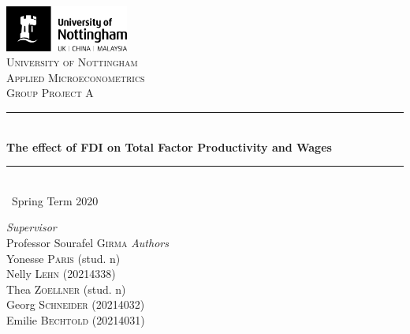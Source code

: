 \documentclass[a4paper,12pt]{scrartcl}
\newcommand{\sectionnumbering}[1]{%
  \setcounter{section}{0}%
   \renewcommand{\thesection}{\csname #1\endcsname{section}}}
\begin{document}
	\begin{titlepage}
		\newcommand{\HRule}{\rule{\linewidth}{0.5mm}}
		
	\vfill\vfill
	\includegraphics[height=1.5cm]{UoN_Logo}\\[1cm] 


	\center			
	\textsc{\LARGE University of Nottingham}\\[1.5cm] 
	\textsc{\Large Applied Microeconometrics}\\[0.5cm] 	
	\textsc{\large Group Project A}\\[0.5cm] 
	
	\HRule\\[0.4cm]
	{\huge\bfseries The effect of FDI on Total Factor Productivity and Wages}\\[0.4cm] 
	\HRule\\[0.4cm]
	
	{\large\ Spring Term 2020} 	
	\vfill\vfill\vfill 		
	
\begin{flushleft}
			\large
			\textit{Supervisor}\\
			Professor Sourafel \textsc{Girma} 
			\vfill\vfill 
			\textit{Authors}\\
			Yonesse \textsc{Paris} (stud. n)\\
			Nelly  \textsc{Lehn} (20214338)\\
			Thea  \textsc{Zoellner} (stud. n)\\
			Georg  \textsc{Schneider} (20214032)\\
			Emilie \textsc{Bechtold} (20214031)
		\end{flushleft}
	\vfill 
	
\end{titlepage}


\sectionnumbering{Roman}
\tableofcontents

\newpage

\listoftables
\newpage

\sectionnumbering{arabic}
\end{document}
